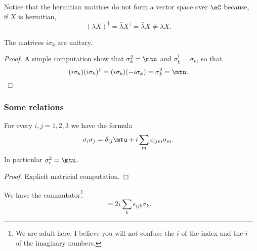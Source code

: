 Notice that the hermitian matrices do not form a vector space over \( \eC\) because, if \( X\) is hermitian,
\begin{equation}
    (\lambda X)^{\dag}=\bar \lambda X^{\dag}=\bar \lambda X\neq \lambda X.
\end{equation}

\begin{lemma}
    The matrices \( i\sigma_k\) are unitary.
\end{lemma}

\begin{proof}
    A simple computation show that \( \sigma_k^2=\mtu\) and \( \sigma_k^{\dag}=\sigma_k\), so that 
    \begin{equation}
        (i\sigma_k)(i\sigma_k)^{\dag}=(i\sigma_k)(-i\sigma_k)=\sigma_k^2=\mtu.
    \end{equation}
\end{proof}


\subsubsection{Some relations}

\begin{lemma}       \label{LEMooIBJMooTYnooZ}
    For every \( i,j=1,2,3\) we have the formula
    \begin{equation}
        \sigma_i\sigma_j=\delta_{ij}\mtu+i\sum_m\epsilon_{ijm}\sigma_m.
    \end{equation}
    In particular \( \sigma_i^2=\mtu\).
\end{lemma}

\begin{proof}
    Explicit matricial computation.
\end{proof}

\begin{lemma}       \label{LEMooJRWXooMkzRnk}
    We have the commutator\footnote{We are adult here; I believe you will not confuse the \( i\) of the index and the \( i\) of the imaginary numbers.}
    \begin{equation}
        [\sigma_i,\sigma_j]=2i\sum_k\epsilon_{ijk}\sigma_k.
    \end{equation}
\end{lemma}

